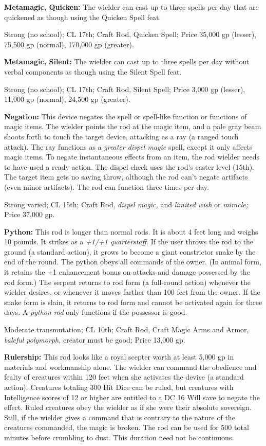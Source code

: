 \documentclass{article}
\begin{document}
\textbf{Metamagic, Quicken:} The wielder can cast up to three spells per day that 
are quickened as though using the Quicken Spell feat.

Strong (no school); CL 17th; Craft Rod, Quicken Spell; Price 35,000 gp (lesser), 
75,500 gp (normal), 170,000 gp (greater).

\textbf{Metamagic, Silent:} The wielder can cast up to three spells per day without 
verbal components as though using the Silent Spell feat.

Strong (no school); CL 17th; Craft Rod, Silent Spell; Price 3,000 gp (lesser), 
11,000 gp (normal), 24,500 gp (greater).

\textbf{Negation: }This device negates the spell or spell-like function or functions 
of magic items. The wielder points the rod at the magic item, and a pale gray beam 
shoots forth to touch the target device, attacking as a ray (a ranged touch attack). 
The ray functions as a \textit{greater dispel magic }spell, except it only affects 
magic items. To negate instantaneous effects from an item, the rod wielder needs 
to have used a ready action. The dispel check uses the rod's caster level (15th). 
The target item gets no saving throw, although the rod can't negate artifacts (even 
minor artifacts). The rod can function three times per day.

Strong varied; CL 15th; Craft Rod, \textit{dispel magic, }and \textit{limited wish 
}or \textit{miracle; }Price 37,000 gp.

\textbf{Python: }This rod is longer than normal rods. It is about 4 feet long and 
weighs 10 pounds. It strikes as a \textit{+1/+1 quarterstaff}. If the user throws 
the rod to the ground (a standard action), it grows to become a giant constrictor 
snake by the end of the round. The python obeys all commands of the owner. (In 
animal form, it retains the +1 enhancement bonus on attacks and damage possessed 
by the rod form.) The serpent returns to rod form (a full-round action) whenever 
the wielder desires, or whenever it moves farther than 100 feet from the owner. 
If the snake form is slain, it returns to rod form and cannot be activated again 
for three days. A \textit{python rod }only functions if the possessor is good.

Moderate transmutation; CL 10th; Craft Rod, Craft Magic Arms and Armor, \textit{baleful 
polymorph, }creator must be good; Price 13,000 gp.

\textbf{Rulership:} This rod looks like a royal scepter worth at least 5,000 gp 
in materials and workmanship alone. The wielder can command the obedience and fealty 
of creatures within 120 feet when she activates the device (a standard action). 
Creatures totaling 300 Hit Dice can be ruled, but creatures with Intelligence scores 
of 12 or higher are entitled to a DC 16 Will save to negate the effect. Ruled creatures 
obey the wielder as if she were their absolute sovereign. Still, if the wielder 
gives a command that is contrary to the nature of the creatures commanded, the 
magic is broken. The rod can be used for 500 total minutes before crumbling to 
dust. This duration need not be continuous.
\end{document}
